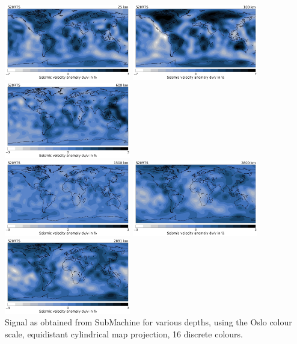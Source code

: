 \begin{center}
\includegraphics[width=5.5cm]{python_codes/fieldstone_85/images/submachine/submachine_S20RTS_25km_SMALL.jpg}
\includegraphics[width=5.5cm]{python_codes/fieldstone_85/images/submachine/submachine_S20RTS_100km_SMALL.jpg}
\includegraphics[width=5.5cm]{python_codes/fieldstone_85/images/submachine/submachine_S20RTS_600km_SMALL.jpg}\\
\includegraphics[width=5.5cm]{python_codes/fieldstone_85/images/submachine/submachine_S20RTS_1500km_SMALL.jpg}
\includegraphics[width=5.5cm]{python_codes/fieldstone_85/images/submachine/submachine_S20RTS_2800km_SMALL.jpg}
\includegraphics[width=5.5cm]{python_codes/fieldstone_85/images/submachine/submachine_S20RTS_2891km_SMALL.jpg}\\
{\captionfont Signal as obtained from SubMachine for various depths, using the Oslo colour scale, equidistant cylindrical map projection, 
16 discrete colours.}
\end{center}



